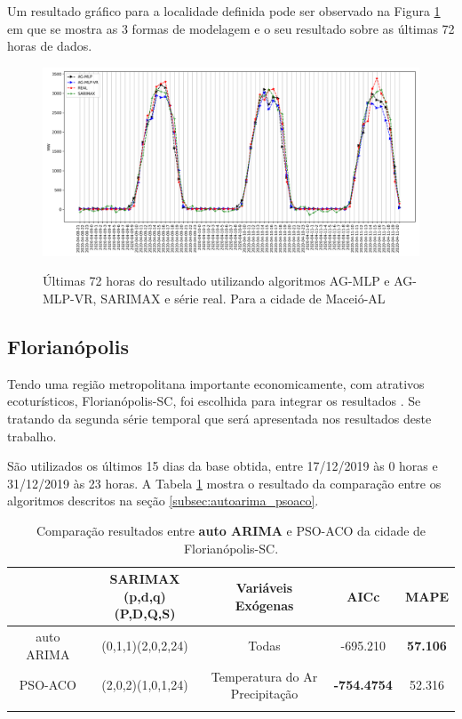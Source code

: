 Um resultado gráfico para a localidade definida pode ser observado na Figura \ref{fig:cap4_maceio_3_days_hibrids} em que se mostra as 3 formas de modelagem e o seu resultado sobre as últimas 72 horas de dados.

\begin{figure}[!htbp]
    \centering
    \caption{Últimas 72 horas do resultado utilizando algoritmos AG-MLP e AG-MLP-VR, SARIMAX e série real. Para a cidade de Maceió-AL}
    \includegraphics[width=\textwidth]{Figuras/results/comparison_hibrids_mc.png}
    \label{fig:cap4_maceio_3_days_hibrids}
\end{figure}

\subsection{Florianópolis}

Tendo uma região metropolitana importante economicamente, com atrativos ecoturísticos, Florianópolis-SC, foi escolhida para integrar os resultados \cite{bittencourt2015ecoturismo, cavanus2021sapiens}. Se tratando da segunda série temporal que será apresentada nos resultados deste trabalho.

São utilizados os últimos 15 dias da base obtida, entre 17/12/2019 às 0 horas e 31/12/2019 às 23 horas. A Tabela \ref{tab:cap4_comp_flor_autoarima_psoaco} mostra o resultado da comparação entre os algoritmos descritos na seção \ref{subsec:autoarima_psoaco}.

\begin{table}[htbp]
\caption{Comparação resultados entre \textbf{auto ARIMA} e PSO-ACO da cidade de Florianópolis-SC.}
\begin{center}
\begin{tabular}{ccccc}
                    & \Longstack{SARIMAX \\ (p,d,q)(P,D,Q,S)} & Variáveis Exógenas & AICc & MAPE  \\\hline
auto ARIMA & (0,1,1)(2,0,2,24) & Todas & -695.210 & \textbf{57.106} \\\hline
PSO-ACO             & (2,0,2)(1,0,1,24) & \Longstack{Temperatura do Ar \\ Precipitação} & \textbf{-754.4754} & 52.316 \\\hline
\label{tab:cap4_comp_flor_autoarima_psoaco}
\end{tabular}
\end{center}
\end{table}

